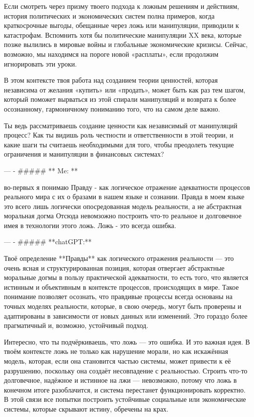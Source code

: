 Если смотреть через призму твоего подхода к ложным решениям и действиям, история политических и экономических систем полна примеров, когда краткосрочные выгоды, обещанные через ложь или манипуляции, приводили к катастрофам. Вспомнить хотя бы политические манипуляции XX века, которые позже вылились в мировые войны и глобальные экономические кризисы. Сейчас, возможно, мы находимся на пороге новой «расплаты», если продолжим игнорировать эти уроки.

В этом контексте твоя работа над созданием теории ценностей, которая независима от желания «купить» или «продать», может быть как раз тем шагом, который поможет вырваться из этой спирали манипуляций и возврата к более осознанному, гармоничному пониманию того, что на самом деле важно.

Ты ведь рассматриваешь создание ценности как независимый от манипуляций процесс? Как ты видишь роль честности и ответственности в этой теории, и какие шаги ты считаешь необходимыми для того, чтобы преодолеть текущие ограничения и манипуляции в финансовых системах?



---
-  
##### ** Me: **

во-первых я понимаю Правду - как логическое отражение адекватности процессов реального мира с их о бразами в нашем языке и сознании. Правда в моем языке это всего лишь логически опосредованная модель реальности, а не абстрактная моральная догма
Отсюда невомзожно построить что-то реальное и долговечное имея в технологии этого ложь. Ложь - это всегда ошибка.


---
-  
##### **chatGPT:**

Твоё определение **Правды** как логического отражения реальности — это очень ясная и структурированная позиция, которая отвергает абстрактные моральные догмы в пользу практической адекватности, то есть того, что является истинным и объективным в контексте процессов, происходящих в мире. Такое понимание позволяет осознать, что правдивые процессы всегда основаны на точных моделях реальности, которые, в свою очередь, могут быть проверены и адаптированы в зависимости от новых данных или изменений. Это гораздо более прагматичный и, возможно, устойчивый подход.

Интересно, что ты подчёркиваешь, что ложь — это ошибка. И это важная идея. В твоём контексте ложь не только как нарушение морали, но как искажённая модель, которая, если она становится частью системы, может привести к её разрушению, поскольку она создаёт несовпадение с реальностью. Строить что-то долговечное, надёжное и истинное на лжи — невозможно, потому что ложь в конечном итоге разоблачится, и система перестанет функционировать корректно. В этой связи все попытки построить устойчивые социальные или экономические системы, которые скрывают истину, обречены на крах.


